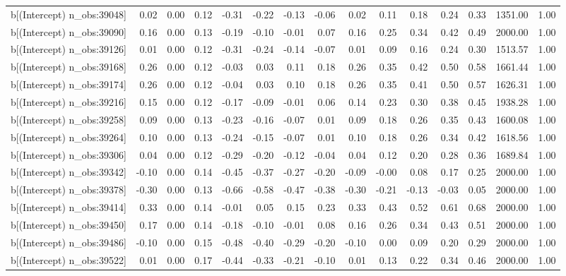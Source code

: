 \begin{table}[ht]
\begin{tabular}{rrrrrrrrrrrrrrr}
  b[(Intercept) n\_obs:39048] & 0.02 & 0.00 & 0.12 & -0.31 & -0.22 & -0.13 & -0.06 & 0.02 & 0.11 & 0.18 & 0.24 & 0.33 & 1351.00 & 1.00 \\ 
  b[(Intercept) n\_obs:39090] & 0.16 & 0.00 & 0.13 & -0.19 & -0.10 & -0.01 & 0.07 & 0.16 & 0.25 & 0.34 & 0.42 & 0.49 & 2000.00 & 1.00 \\ 
  b[(Intercept) n\_obs:39126] & 0.01 & 0.00 & 0.12 & -0.31 & -0.24 & -0.14 & -0.07 & 0.01 & 0.09 & 0.16 & 0.24 & 0.30 & 1513.57 & 1.00 \\ 
  b[(Intercept) n\_obs:39168] & 0.26 & 0.00 & 0.12 & -0.03 & 0.03 & 0.11 & 0.18 & 0.26 & 0.35 & 0.42 & 0.50 & 0.58 & 1661.44 & 1.00 \\ 
  b[(Intercept) n\_obs:39174] & 0.26 & 0.00 & 0.12 & -0.04 & 0.03 & 0.10 & 0.18 & 0.26 & 0.35 & 0.41 & 0.50 & 0.57 & 1626.31 & 1.00 \\ 
  b[(Intercept) n\_obs:39216] & 0.15 & 0.00 & 0.12 & -0.17 & -0.09 & -0.01 & 0.06 & 0.14 & 0.23 & 0.30 & 0.38 & 0.45 & 1938.28 & 1.00 \\ 
  b[(Intercept) n\_obs:39258] & 0.09 & 0.00 & 0.13 & -0.23 & -0.16 & -0.07 & 0.01 & 0.09 & 0.18 & 0.26 & 0.35 & 0.43 & 1600.08 & 1.00 \\ 
  b[(Intercept) n\_obs:39264] & 0.10 & 0.00 & 0.13 & -0.24 & -0.15 & -0.07 & 0.01 & 0.10 & 0.18 & 0.26 & 0.34 & 0.42 & 1618.56 & 1.00 \\ 
  b[(Intercept) n\_obs:39306] & 0.04 & 0.00 & 0.12 & -0.29 & -0.20 & -0.12 & -0.04 & 0.04 & 0.12 & 0.20 & 0.28 & 0.36 & 1689.84 & 1.00 \\ 
  b[(Intercept) n\_obs:39342] & -0.10 & 0.00 & 0.14 & -0.45 & -0.37 & -0.27 & -0.20 & -0.09 & -0.00 & 0.08 & 0.17 & 0.25 & 2000.00 & 1.00 \\ 
  b[(Intercept) n\_obs:39378] & -0.30 & 0.00 & 0.13 & -0.66 & -0.58 & -0.47 & -0.38 & -0.30 & -0.21 & -0.13 & -0.03 & 0.05 & 2000.00 & 1.00 \\ 
  b[(Intercept) n\_obs:39414] & 0.33 & 0.00 & 0.14 & -0.01 & 0.05 & 0.15 & 0.23 & 0.33 & 0.43 & 0.52 & 0.61 & 0.68 & 2000.00 & 1.00 \\ 
  b[(Intercept) n\_obs:39450] & 0.17 & 0.00 & 0.14 & -0.18 & -0.10 & -0.01 & 0.08 & 0.16 & 0.26 & 0.34 & 0.43 & 0.51 & 2000.00 & 1.00 \\ 
  b[(Intercept) n\_obs:39486] & -0.10 & 0.00 & 0.15 & -0.48 & -0.40 & -0.29 & -0.20 & -0.10 & 0.00 & 0.09 & 0.20 & 0.29 & 2000.00 & 1.00 \\ 
  b[(Intercept) n\_obs:39522] & 0.01 & 0.00 & 0.17 & -0.44 & -0.33 & -0.21 & -0.10 & 0.01 & 0.13 & 0.22 & 0.34 & 0.46 & 2000.00 & 1.00 \\ 

\end{tabular}
\end{table}
